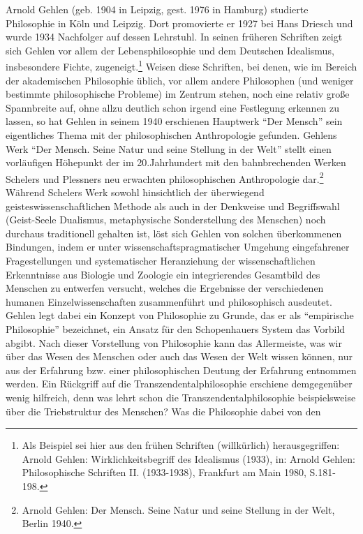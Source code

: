 \documentclass[12pt,a4paper]{article}
\begin{document}
Arnold Gehlen (geb. 1904 in Leipzig, gest. 1976 in Hamburg) studierte
Philosophie in Köln und Leipzig. Dort promovierte er 1927 bei Hans
Driesch und wurde 1934 Nachfolger auf dessen Lehrstuhl. In seinen
früheren Schriften zeigt sich Gehlen vor allem der Lebensphilosophie und
dem Deutschen Idealismus, insbesondere Fichte, zugeneigt.\footnote{Als
  Beispiel sei hier aus den frühen Schriften (willkürlich)
  herausgegriffen: Arnold Gehlen: Wirklichkeitsbegriff des Idealismus
  (1933), in: Arnold Gehlen: Philosophische Schriften II.  (1933-1938),
  Frankfurt am Main 1980, S.181-198.} Weisen diese Schriften, bei denen,
wie im Bereich der akademischen Philosophie üblich, vor allem andere
Philosophen (und weniger bestimmte philosophische Probleme) im Zentrum
stehen, noch eine relativ große Spannbreite auf, ohne allzu deutlich
schon irgend eine Festlegung erkennen zu lassen, so hat Gehlen in seinem
1940 erschienen Hauptwerk "`Der Mensch"' sein eigentliches Thema mit der
philosophischen Anthropologie gefunden. Gehlens Werk "`Der Mensch. Seine
Natur und seine Stellung in der Welt"' stellt einen vorläufigen
Höhepunkt der im 20.Jahrhundert mit den bahnbrechenden Werken Schelers
und Plessners neu erwachten philosophischen Anthropologie
dar.\footnote{Arnold Gehlen: Der Mensch. Seine Natur und seine Stellung
  in der Welt, Berlin 1940.}  Während Schelers Werk sowohl hinsichtlich
der überwiegend geisteswissenschaftlichen Methode als auch in der
Denkweise und Begriffswahl (Geist-Seele Dualismus, metaphysische
Sonderstellung des Menschen) noch durchaus traditionell gehalten ist,
löst sich Gehlen von solchen überkommenen Bindungen, indem er unter
wissenschaftspragmatischer Umgehung eingefahrener Fragestellungen und
systematischer Heranziehung der wissenschaftlichen Erkenntnisse aus
Biologie und Zoologie ein integrierendes Gesamtbild des Menschen zu
entwerfen versucht, welches die Ergebnisse der verschiedenen humanen
Einzelwissenschaften zusammenführt und philosophisch ausdeutet. Gehlen
legt dabei ein Konzept von Philosophie zu Grunde, das er als
"`empirische Philosophie"' bezeichnet, ein Ansatz für den Schopenhauers
System das Vorbild abgibt. Nach dieser Vorstellung von Philosophie kann
das Allermeiste, was wir über das Wesen des Menschen oder auch das Wesen
der Welt wissen können, nur aus der Erfahrung bzw. einer philosophischen
Deutung der Erfahrung entnommen werden. Ein Rückgriff auf die
Transzendentalphilosophie erschiene demgegenüber wenig hilfreich, denn
was lehrt schon die Transzendentalphilosophie beispielsweise über die
Triebstruktur des Menschen? Was die Philosophie dabei von den
\end{document}
